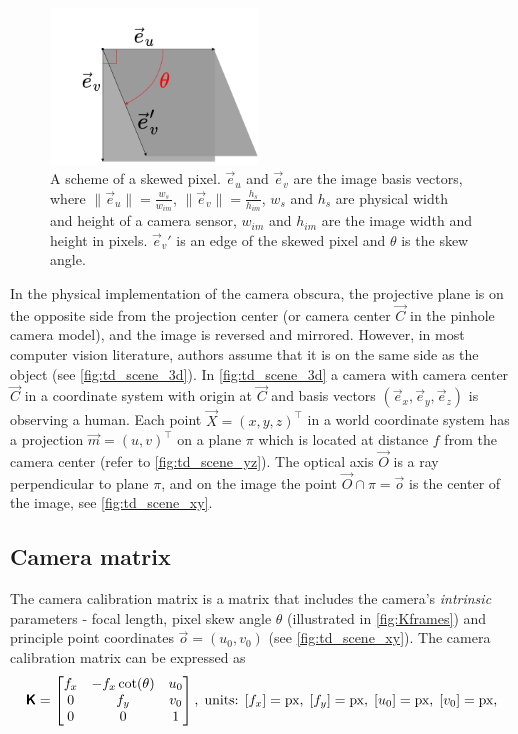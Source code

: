 \begin{figure}[ht]
  \centering
  \includegraphics[width=0.49\textwidth]{graphics/pixel.png}
  \caption[A scheme of a skewed pixel.]{A scheme of a skewed pixel. $\vec{e}_u$ and $\vec{e}_v$ are the image basis vectors, where $\lVert \vec{e}_u \rVert = \frac{w_s}{w_{im}}$, $\lVert \vec{e}_v \rVert = \frac{h_s}{h_{im}}$, $w_s$ and $h_s$ are physical width and height of a camera sensor, $w_{im}$ and $h_{im}$ are the image width and height in pixels. $\vec{e}_v'$ is an edge of the skewed pixel and $\theta$ is the skew angle.}
  \label{fig:Kframes}
\end{figure}

In the physical implementation of the camera obscura, the projective plane is on the opposite side from the projection center (or camera center $\vec{C}$ in the pinhole camera model), and the image is reversed and mirrored. 
However, in most computer vision literature, authors assume that it is on the same side as the object (see \autoref{fig:td_scene_3d}).
In \autoref{fig:td_scene_3d} a camera with camera center $\vec{C}$ in a coordinate system with origin at $\vec{C}$ and basis vectors $(\vec{e}_x, \vec{e}_y, \vec{e}_z)$ is observing a human. 
Each point $\vec{X} = (x, y, z)^\top$ in a world coordinate system has a projection $\vec{m} = (u, v)^\top$ on a plane $\pi$ which is located at distance $f$ from the camera center (refer to \autoref{fig:td_scene_yz}). 
The optical axis $\vec{O}$ is a ray perpendicular to plane $\pi$, and on the image the point $ \vec{O} \cap \pi = \vec{o}$ is the center of the image, see \autoref{fig:td_scene_xy}.

\subsection{Camera matrix}
The camera calibration matrix is a matrix that includes the camera's \textit{intrinsic} parameters - focal length, pixel skew angle $\theta$ (illustrated in \autoref{fig:Kframes}) and principle point coordinates $\vec{o} = (u_0, v_0)$ (see \autoref{fig:td_scene_xy}).
The camera calibration matrix can be expressed as
\begin{equation}
    \pmb{\mathsf{K}} = \begin{bmatrix}
        f_x & -f_x \cot(\theta) & u_0 \\
        0 & f_y & v_0 \\
        0 & 0 & 1 \\
    \end{bmatrix},
    \textrm{\;units: } [f_x]=\textrm{px},\; [f_y]=\textrm{px},\; [u_0]=\textrm{px},\; [v_0]=\textrm{px},
\end{equation}

